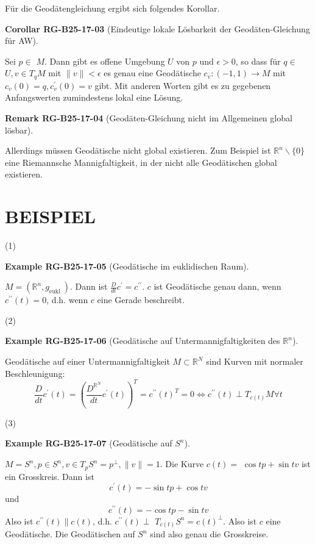 \documentclass[10pt, letterpaper]{article}
\newcommand{\R}{\mathbb{R}}
\newcommand{\CustomHeading}[3]{%
  \par\medskip\noindent%
  \textbf{#1 #2} \textnormal{(#3)}.\enskip%
}
\newenvironment{KORO}[2]{\begin{unitbox}\CustomHeading{Corollar}{#1}{#2}}{\end{unitbox}}
\newenvironment{REM}[2]{\begin{unitbox}\CustomHeading{Remark}{#1}{#2}}{\end{unitbox}}
\newenvironment{EXA}[2]{\begin{unitbox}\CustomHeading{Example}{#1}{#2}}{\end{unitbox}}
\begin{document}
Für die Geodätengleichung ergibt sich folgendes Korollar. 


\begin{KORO}{RG-B25-17-03}{Eindeutige lokale Lösbarkeit der Geodäten-Gleichung für AW}
Sei $p \in$ $M$. Dann gibt es offene Umgebung $U$ von $p$ und $\epsilon>0$, so dass für $q \in$ $U, v \in T_{q} M$ mit $\|v\|<\epsilon$ es genau eine Geodätische $c_{v}:(-1,1) \rightarrow M$ mit $c_{v}(0)=q, c_{v}^{\prime}(0)=v$ gibt. Mit anderen Worten gibt es zu gegebenen Anfangswerten zumindestens lokal eine Lösung.
\end{KORO}


\begin{REM}{RG-B25-17-04}{Geodäten-Gleichung nicht im Allgemeinen global lösbar}
Allerdings müssen Geodätische nicht global existieren. Zum Beispiel ist $\mathbb{R}^{n} \backslash\{0\}$ eine Riemannsche Mannigfaltigkeit, in der nicht alle Geodätischen global existieren.
\end{REM}

\section*{BEISPIEL}


(1) 

\begin{EXA}{RG-B25-17-05}{Geodätische im euklidischen Raum}
$M=\left(\mathbb{R}^{n}, g_{\text {eukl }}\right)$. Dann ist $\frac{D}{d t} c^{\prime}=c^{\prime \prime}$. $c$ ist Geodätische genau dann, wenn $c^{\prime \prime}(t)=0$, d.h. wenn $c$ eine Gerade beschreibt.
\end{EXA}



(2) 


\begin{EXA}{RG-B25-17-06}{Geodätische auf Untermannigfaltigkeiten des $\R^n$}
Geodätische auf einer Untermannigfaltigkeit $M \subset \mathbb{R}^{N}$ sind Kurven mit normaler Beschleunigung:
$$
\frac{D}{d t} c^{\prime}(t)=\left(\frac{D^{\mathbb{R}^{N}}}{d t} c^{\prime}(t)\right)^{T}=c^{\prime \prime}(t)^{T}=0 \Longleftrightarrow c^{\prime \prime}(t) \perp T_{c(t)} M \forall t
$$
\end{EXA}

(3) 

\begin{EXA}{RG-B25-17-07}{Geodätische auf $S^n$}
$M=S^{n}, p \in S^{n}, v \in T_{p} S^{n}=p^{\perp},\|v\|=1$. Die Kurve $c(t)=$ $\cos t p+\sin t v$ ist ein Grosskreis. Dann ist 
$$c^{\prime}(t)=-\sin t p+\cos t v$$ 
und 
$$c^{\prime \prime}(t)=-\cos t p-\sin t v$$ 
Also ist $c^{\prime \prime}(t) \| c(t)$, d.h. $c^{\prime \prime}(t) \perp$ $T_{c(t)} S^{n}=c(t)^{\perp}$. Also ist $c$ eine Geodätische. Die Geodätischen auf $S^{n}$ sind also genau die Grosskreise.
\end{EXA}
\end{document}

